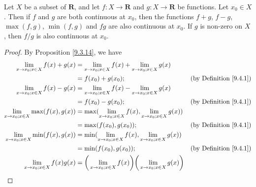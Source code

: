 \begin{proposition}\label{9.4.9}
    Let \(X\) be a subset of \(\mathbf{R}\), and let \(f : X \to \mathbf{R}\) and \(g : X \to \mathbf{R}\) be functions.
    Let \(x_0 \in X\).
    Then if \(f\) and \(g\) are both continuous at \(x_0\), then the functions \(f + g\), \(f - g\), \(\max(f, g)\), \(\min(f, g)\) and \(fg\) are also continuous at \(x_0\).
    If \(g\) is non-zero on \(X\), then \(f / g\) is also continuous at \(x_0\).
\end{proposition}

\begin{proof}
    By Proposition \ref{9.3.14}, we have
    \begin{align*}
        \lim_{x \to x_0 ; x \in X} f(x) + g(x)      & = \lim_{x \to x_0 ; x \in X} f(x) + \lim_{x \to x_0 ; x \in X} g(x)                                                            \\
                                                    & = f(x_0) + g(x_0);                                                                       & \text{(by Definition \ref{9.4.1})}  \\
        \lim_{x \to x_0 ; x \in X} f(x) - g(x)      & = \lim_{x \to x_0 ; x \in X} f(x) - \lim_{x \to x_0 ; x \in X} g(x)                                                            \\
                                                    & = f(x_0) - g(x_0);                                                                       & \text{(by Definition \ref{9.4.1})}  \\
        \lim_{x \to x_0 ; x \in X} \max(f(x), g(x)) & = \max(\lim_{x \to x_0 ; x \in X} f(x), \lim_{x \to x_0 ; x \in X} g(x))                                                       \\
                                                    & = \max(f(x_0), g(x_0));                                                                  & \text{(by Definition \ref{9.4.1})}  \\
        \lim_{x \to x_0 ; x \in X} \min(f(x), g(x)) & = \min(\lim_{x \to x_0 ; x \in X} f(x), \lim_{x \to x_0 ; x \in X} g(x))                                                       \\
                                                    & = \min(f(x_0), g(x_0));                                                                  & \text{(by Definition \ref{9.4.1})}  \\
        \lim_{x \to x_0 ; x \in X} f(x) g(x)        & = \bigg(\lim_{x \to x_0 ; x \in X} f(x)\bigg)\bigg(\lim_{x \to x_0 ; x \in X} g(x)\bigg)                                       \\

\end{align*}
\end{proof}

